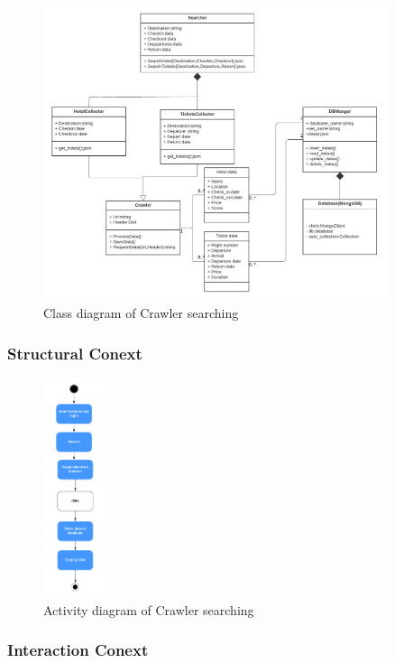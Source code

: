 \documentclass[conference]{IEEEtran}
\begin{document}
\begin{figure}[htbp]
	\centerline{\includegraphics[width=0.9\textwidth]{image/crawler search class1.pdf}}
	\caption{Class diagram of Crawler searching }
	\label{class1}
\end{figure}

\subsubsection{\textbf{Structural Conext }}

\begin{figure}[htbp]
	\centerline{\includegraphics[width=0.16\textwidth]{image/crawler activity1.pdf}}
	\caption{Activity diagram of Crawler searching }
	\label{activity1}
\end{figure}


\subsubsection{\textbf{Interaction Conext }}
\end{document}
